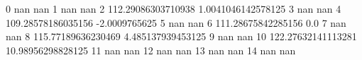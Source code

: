 0 nan nan
1 nan nan
2 112.29086303710938 1.0041046142578125
3 nan nan
4 109.28578186035156 -2.0009765625
5 nan nan
6 111.28675842285156 0.0
7 nan nan
8 115.77189636230469 4.485137939453125
9 nan nan
10 122.27632141113281 10.98956298828125
11 nan nan
12 nan nan
13 nan nan
14 nan nan
